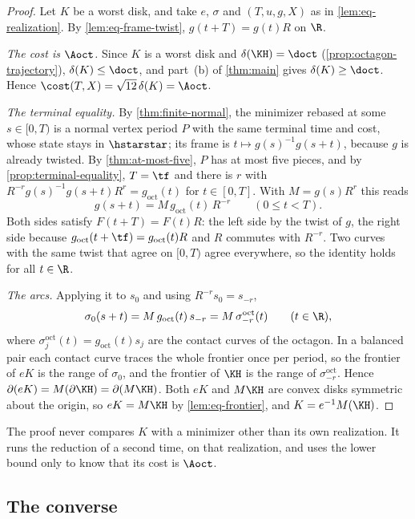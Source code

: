 \begin{proof}
Let $K$ be a worst disk, and take $e$, $\sigma$ and $(T,u,g,X)$ as in \cref{lem:eq-realization}.
By \cref{lem:eq-frame-twist}, $g(t+T)=g(t)R$ on $\R$.

\emph{The cost is $\Aoct$.} Since $K$ is a worst disk and $\delta(\KH)=\doct$
(\cref{prop:octagon-trajectory}), $\delta(K)\le\doct$, and part~(b) of \cref{thm:main} gives
$\delta(K)\ge\doct$. Hence $\cost(T,X)=\sqrt{12}\,\delta(K)=\Aoct$.

\emph{The terminal equality.} By \cref{thm:finite-normal}, the minimizer rebased at some
$s\in[0,T)$ is a normal vertex period $P$ with the same terminal time and cost, whose state stays
in $\hstarstar$; its frame is $t\mapsto g(s)^{-1}g(s+t)$, because $g$ is already twisted. By
\cref{thm:at-most-five}, $P$ has at most five pieces, and by \cref{prop:terminal-equality},
$T=\tf$ and there is $r$ with $R^{-r}g(s)^{-1}g(s+t)R^{r}=g_{\mathrm{oct}}(t)$ for $t\in[0,T]$.
With $M=g(s)R^r$ this reads
\[
 g(s+t)=M\,g_{\mathrm{oct}}(t)\,R^{-r}\qquad(0\le t<T).
\]
Both sides satisfy $F(t+T)=F(t)R$: the left side by the twist of $g$, the right side because
$g_{\mathrm{oct}}(t+\tf)=g_{\mathrm{oct}}(t)R$ and $R$ commutes with $R^{-r}$. Two curves with the
same twist that agree on $[0,T)$ agree everywhere, so the identity holds for all $t\in\R$.

\emph{The arcs.} Applying it to $s_0$ and using $R^{-r}s_0=s_{-r}$,
\[
 \sigma_0(s+t)=M\,g_{\mathrm{oct}}(t)\,s_{-r}=M\,\sigma^{\mathrm{oct}}_{-r}(t)\qquad(t\in\R),
\]
where $\sigma^{\mathrm{oct}}_j(t)=g_{\mathrm{oct}}(t)s_j$ are the contact curves of the octagon.
In a balanced pair each contact curve traces the whole frontier once per period, so the frontier
of $eK$ is the range of $\sigma_0$, and the frontier of $\KH$ is the range of
$\sigma^{\mathrm{oct}}_{-r}$. Hence $\partial(eK)=M(\partial\KH)=\partial(M\KH)$. Both $eK$ and
$M\KH$ are convex disks symmetric about the origin, so $eK=M\KH$ by \cref{lem:eq-frontier}, and
$K=e^{-1}M(\KH)$.
\end{proof}

The proof never compares $K$ with a minimizer other than its own realization. It runs the
reduction of  a second time, on that realization, and uses
the lower bound only to know that its cost is $\Aoct$.

\subsection{The converse}\label{sec:equality-converse}

